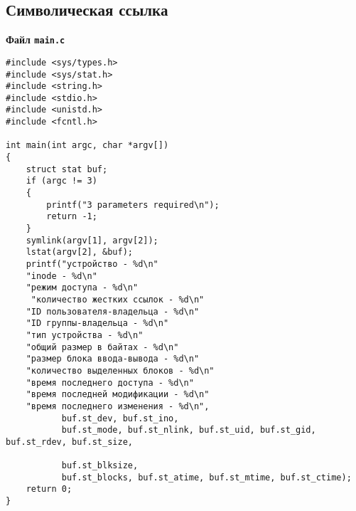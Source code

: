 \documentclass[a4paper,12pt]{extarticle}
\begin{document}
\subsection{Символическая ссылка}\label{code:symlink}
\centerline{\textbf{Файл \texttt{main.c}}}
\begin{verbatim}
#include <sys/types.h>
#include <sys/stat.h>
#include <string.h>
#include <stdio.h>
#include <unistd.h>
#include <fcntl.h>

int main(int argc, char *argv[])
{
    struct stat buf;
    if (argc != 3)
    {
        printf("3 parameters required\n");
        return -1;
    }
    symlink(argv[1], argv[2]);
    lstat(argv[2], &buf);
    printf("устройство - %d\n"
    "inode - %d\n"
    "режим доступа - %d\n"
     "количество жестких ссылок - %d\n"
    "ID пользователя-владельца - %d\n"
    "ID группы-владельца - %d\n"
    "тип устройства - %d\n"
    "общий размер в байтах - %d\n"
    "размер блока ввода-вывода - %d\n"
    "количество выделенных блоков - %d\n"
    "время последнего доступа - %d\n"
    "время последней модификации - %d\n"
    "время последнего изменения - %d\n",
           buf.st_dev, buf.st_ino,
           buf.st_mode, buf.st_nlink, buf.st_uid, buf.st_gid, buf.st_rdev, buf.st_size,
           
           buf.st_blksize,
           buf.st_blocks, buf.st_atime, buf.st_mtime, buf.st_ctime);
    return 0;
}
\end{verbatim}
\hrulefill
\end{document}

